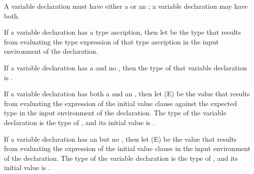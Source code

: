 A variable declaration must have either a  or an ; a variable declaration may have both.

If a variable declaration has a type ascription, then let  be the type that results from evaluating the type expression of that type ascription in the input environment of the declaration.

If a variable declaration has a  and no , then the type of that variable declaration is .

If a variable declaration has both a  and an , then let \MetaVar(E) be the value that results from evaluating the expression of the initial value clause against the expected type  in the input environment of the declaration.
The type of the variable declaration is the type of , and its initial value is .

If a variable declaration has an  but no , then let \MetaVar(E) be the value that results from evaluating the expression of the initial value clause in the input environment of the declaration.
The type of the variable declaration is the type of , and its initial value is .

